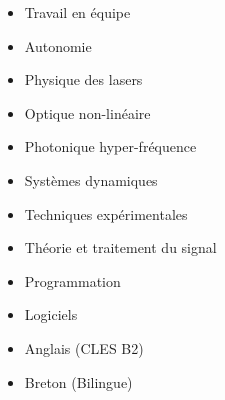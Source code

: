 

\vspace{-0.1em}

\begin{itemize}
\item Travail en équipe
\item Autonomie

\end{itemize}





\divider

\begin{itemize}
	\item {Physique des lasers}
	\item {Optique non-linéaire}
	\item {Photonique hyper-fréquence}
	\item {Systèmes dynamiques}
	\item {Techniques expérimentales}
	\item {Théorie et traitement du signal}
\end{itemize}

\divider


\begin{itemize}
\item Programmation

\smallskip
{}	

\medskip

\item Logiciels

\smallskip
{}
\end{itemize}

\divider


\begin{itemize}

\item Anglais (CLES B2)
\item Breton (Bilingue)

\end{itemize}

\medskip



